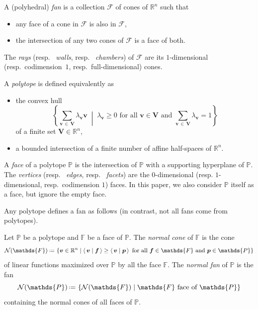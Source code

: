 \documentclass[AHL,Unicode,longabstracts,published]{cedram}
\newcommand{\R}{\mathbb{R}}
\renewcommand{\c}[1]{\mathcal{#1}}
\renewcommand{\b}[1]{\boldsymbol{#1}}
\newcommand{\set}[2]{\left\{ #1 \;\middle|\; #2 \right\}}
\newcommand{\dotprod}[2]{\left\langle \, #1 \; \middle| \; #2 \, \right\rangle}
\newcommand{\eqdef}{\mbox{\,\raisebox{0.2ex}{\scriptsize\ensuremath{\mathrm:}}\ensuremath{=}\,}}
\newcommand{\polytope}[1]{\mathds{#1}}
\begin{document}
\begin{defi}\label{def:fan}
A (polyhedral)
\emph{fan} is a collection $\c{F}$ of cones of $\R^n$ such that
\begin{itemize}
\item any face of a cone in $\c{F}$ is also in $\c{F}$,
\item the intersection of any two cones of $\c{F}$ is a face of both.
\end{itemize}
The
\emph{rays} (resp.~
\emph{walls}, resp.~
\emph{chambers}) of $\c{F}$ are its $1$-dimensional (resp.~codimension~$1$, resp.~full-dimensional) cones.
\end{defi}

\begin{defi}\label{def:polytope}
A
\emph{polytope} is defined equivalently as
\begin{itemize}
\item the convex hull
\[
\set{\sum_{\b{v}\, \in\,\b{V}} \lambda_{\b{v}} \b{v}}{\lambda_{\b{v}} \ge 0 \text{ for all } \b{v} \in \b{V} \text{ and } \sum_{\b{v}\,\in\,\b{V}} \lambda_{\b{v}} = 1}
\]
of a finite set ${\b{V} \in \R^n}$,
\item a bounded intersection of a finite number of affine half-spaces of $\R^n$.
\end{itemize}
A
\emph{face} of a polytope $\polytope{P}$ is the intersection of $\polytope{P}$ with a supporting hyperplane of $\polytope{P}$. The
\emph{vertices} (resp.~
\emph{edges}, resp.~
\emph{facets}) are the $0$-dimensional (resp. $1$-dimensional, resp.~codimension $1$) faces. In this paper, we also consider $\polytope{P}$ itself as a face, but ignore the empty face.
\end{defi}

Any polytope defines a fan as follows (in contrast, not all fans come from polytopes).

\begin{defi}\label{def:normalFan}
Let $\polytope{P}$ be a polytope and $\polytope{F}$ be a face of $\polytope{P}$. The
\emph{normal cone} of $\polytope{F}$ is the cone
\[
\c{N}(\polytope{F}) \eqdef \set{\b{v} \in \R^n}{\dotprod{\b{v}}{\b{f}} \ge \dotprod{\b{v}}{\b{p}} \text{ for all } \b{f} \in \polytope{F} \text{ and } \b{p} \in \polytope{P}}
\]
of linear functions maximized over $\polytope{P}$ by all the face $\polytope{F}$. The
\emph{normal fan} of $\polytope{P}$ is the fan
\[
\c{N}(\polytope{P}) \eqdef \set{\c{N}(\polytope{F})}{\polytope{F} \text{ face of } \polytope{P}}
\]
containing the normal cones of all faces of $\polytope{P}$.
\end{defi}
\end{document}
